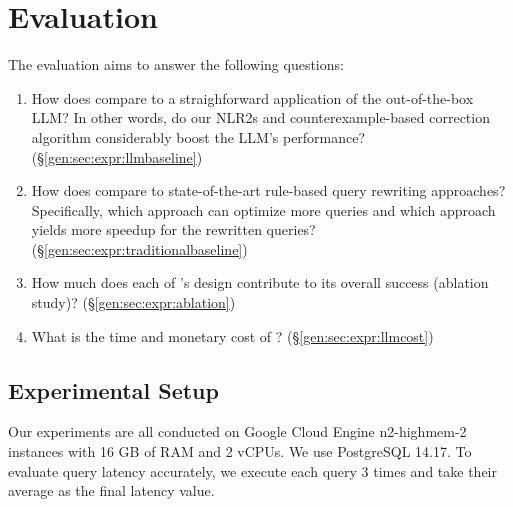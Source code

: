 \section{Evaluation}
\label{gen:sec:expr}

The evaluation aims to answer the following questions:
\begin{enumerate}[leftmargin=0.5cm]
       \item  How does \genrewrite compare to a straighforward application of the out-of-the-box LLM? In other words, do our   NLR2s and counterexample-based correction algorithm considerably boost the LLM's performance? (\S\ref{gen:sec:expr:llmbaseline})

\item How does \genrewrite compare to state-of-the-art rule-based query rewriting approaches? Specifically, which approach can optimize more queries and which approach yields more speedup for the rewritten queries? (\S\ref{gen:sec:expr:traditionalbaseline})

\item  How much does each of \genrewrite's design contribute to its overall success (ablation study)?   (\S\ref{gen:sec:expr:ablation})

\item  What is the time and monetary cost of \genrewrite?  (\S\ref{gen:sec:expr:llmcost})

\end{enumerate}

\subsection{Experimental Setup}
\label{gen:sec:expr:setup}

 Our experiments are all conducted on Google Cloud Engine n2-highmem-2 instances with 16 GB of RAM and 2 vCPUs. We use PostgreSQL 14.17. To evaluate query latency accurately, we execute each query 3 times and take their average as the final latency value. 


 



